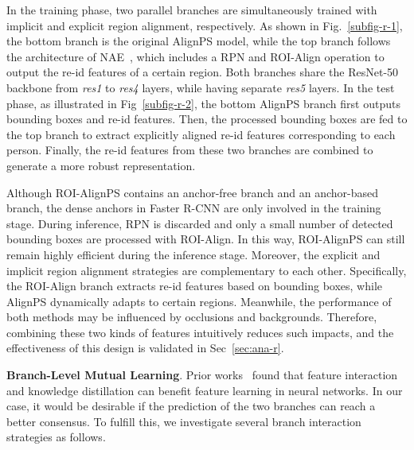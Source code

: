 \documentclass[journal]{IEEEtran}
\begin{document}
In the training phase, two parallel branches are simultaneously trained with implicit and explicit region alignment, respectively. As shown in Fig.~\ref{subfig-r-1}, the bottom branch is the original AlignPS model, while the top branch follows the architecture of NAE~\cite{DBLP:conf/cvpr/ChenZYS20}, which includes a RPN and ROI-Align operation to output the re-id features of a certain region. Both branches share the ResNet-50 backbone from \textit{res1} to \textit{res4} layers, while having separate \textit{res5} layers. In the test phase, as illustrated in Fig~\ref{subfig-r-2}, the bottom AlignPS branch first outputs bounding boxes and re-id features. Then, the processed bounding boxes are fed to the top branch to extract explicitly aligned re-id features corresponding to each person. Finally, the re-id features from these two branches are combined to generate a more robust representation.

Although ROI-AlignPS contains an anchor-free branch and an anchor-based branch, the dense anchors in Faster R-CNN are only involved in the training stage. During inference, RPN is discarded and only a small number of detected bounding boxes are processed with ROI-Align. In this way, ROI-AlignPS can still remain highly efficient during the inference stage. Moreover, the explicit and implicit region alignment strategies are complementary to each other. Specifically, the ROI-Align branch extracts re-id features based on bounding boxes, while AlignPS dynamically adapts to certain regions. Meanwhile, the performance of both methods may be influenced by occlusions and backgrounds. Therefore, combining these two kinds of features intuitively reduces such impacts, and the effectiveness of this design is validated in Sec~\ref{sec:ana-r}.

\textbf{Branch-Level Mutual Learning}. Prior works~\cite{DBLP:journals/pami/LiH18a,DBLP:conf/iccv/PengLZLQT19,Hong_2021_CVPR,Dai_2021_CVPR} found that feature interaction and knowledge distillation can benefit feature learning in neural networks. In our case, it would be desirable if the prediction of the two branches can reach a better consensus. To fulfill this, we investigate several branch interaction strategies as follows.
\end{document}
